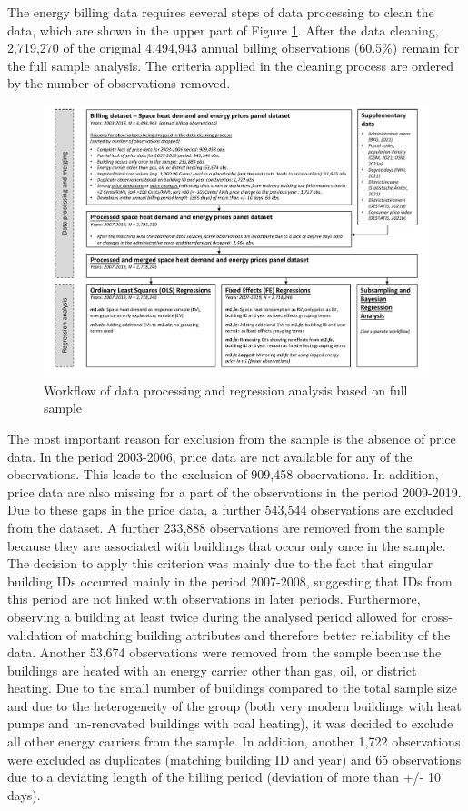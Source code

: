 \documentclass[12pt,twoside]{reedthesis}
\begin{document}
The energy billing data requires several steps of data processing to clean the data, which are shown in the upper part of Figure \ref{fig:workflow1}. After the data cleaning, 2,719,270 of the original 4,494,943 annual billing observations (60.5\%) remain for the full sample analysis. The criteria applied in the cleaning process are ordered by the number of observations removed.
\begin{figure}

{\centering \includegraphics[width=1.03\linewidth]{figure/workflow_diagramm_part1} 

}

\caption{Workflow of data processing and regression analysis based on full sample}\label{fig:workflow1}
\end{figure}
The most important reason for exclusion from the sample is the absence of price data. In the period 2003-2006, price data are not available for any of the observations. This leads to the exclusion of 909,458 observations. In addition, price data are also missing for a part of the observations in the period 2009-2019. Due to these gaps in the price data, a further 543,544 observations are excluded from the dataset. A further 233,888 observations are removed from the sample because they are associated with buildings that occur only once in the sample. The decision to apply this criterion was mainly due to the fact that singular building IDs occurred mainly in the period 2007-2008, suggesting that IDs from this period are not linked with observations in later periods. Furthermore, observing a building at least twice during the analysed period allowed for cross-validation of matching building attributes and therefore better reliability of the data. Another 53,674 observations were removed from the sample because the buildings are heated with an energy carrier other than gas, oil, or district heating. Due to the small number of buildings compared to the total sample size and due to the heterogeneity of the group (both very modern buildings with heat pumps and un-renovated buildings with coal heating), it was decided to exclude all other energy carriers from the sample. In addition, another 1,722 observations were excluded as duplicates (matching building ID and year) and 65 observations due to a deviating length of the billing period (deviation of more than +/- 10 days).
\end{document}
